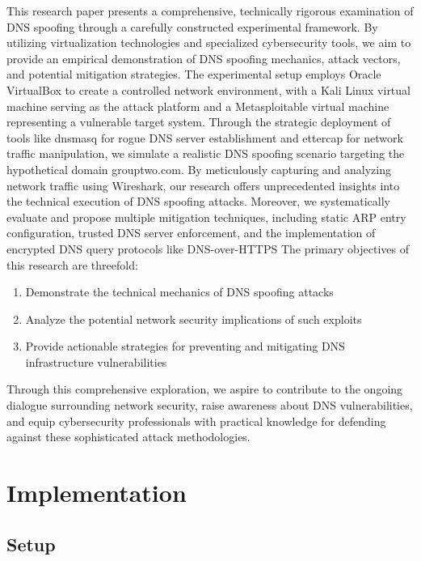 \documentclass[conference,letterpaper]{IEEEtran}
\begin{document}
This research paper presents a comprehensive, technically rigorous examination of DNS spoofing through a carefully constructed experimental framework. By utilizing virtualization technologies and specialized cybersecurity tools, we aim to provide an empirical demonstration of DNS spoofing mechanics, attack vectors, and potential mitigation strategies.
The experimental setup employs Oracle VirtualBox\cite{oracleVirtualBoxGeneralpurposeFull} to create a controlled network environment, with a Kali Linux virtual machine serving as the attack platform and a Metasploitable virtual machine representing a vulnerable target system. Through the strategic deployment of tools like dnsmasq for rogue DNS server establishment and ettercap for network traffic manipulation, we simulate a realistic DNS spoofing scenario targeting the hypothetical domain grouptwo.com.
By meticulously capturing and analyzing network traffic using Wireshark, our research offers unprecedented insights into the technical execution of DNS spoofing attacks. Moreover, we systematically evaluate and propose multiple mitigation techniques, including static ARP entry configuration, trusted DNS server enforcement, and the implementation of encrypted DNS query protocols like DNS-over-HTTPS\cite{csikorPrivacyDNSoverHTTPSRequiem2021}
The primary objectives of this research are threefold:

\begin{enumerate}
\item\label{item:1}  Demonstrate the technical mechanics of DNS spoofing attacks
  \item Analyze the potential network security implications of such exploits
  \item  Provide actionable strategies for preventing and mitigating DNS infrastructure vulnerabilities
\end{enumerate}

Through this comprehensive exploration, we aspire to contribute to the ongoing dialogue surrounding network security, raise awareness about DNS vulnerabilities, and equip cybersecurity professionals with practical knowledge for defending against these sophisticated attack methodologies.

\section{Implementation}
\subsection{Setup}
\end{document}
